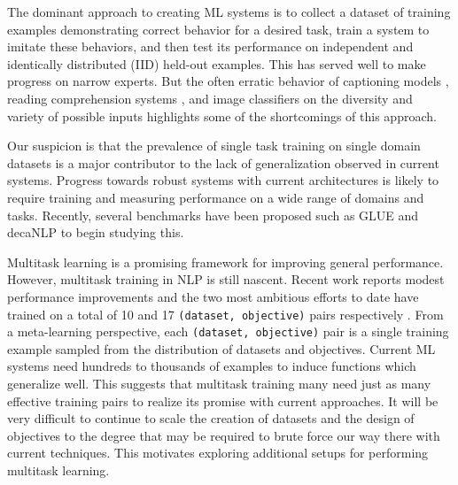 \documentclass{article}
\begin{document}
The dominant approach to creating ML systems is to collect a dataset of training examples demonstrating correct behavior for a desired task, train a system to imitate these behaviors, and then test its performance on independent and identically distributed (IID) held-out examples. This has served well to make progress on narrow experts. But the often erratic behavior of captioning models \cite{lake2017building}, reading comprehension systems \cite{jia2017adversarial}, and image classifiers \cite{alcorn2018strike} on the diversity and variety of possible inputs highlights some of the shortcomings of this approach.


Our suspicion is that the prevalence of single task training on single domain datasets is a major contributor to the lack of generalization observed in current systems. Progress towards robust systems with current architectures is likely to require training and measuring performance on a wide range of domains and tasks. Recently, several benchmarks have been proposed such as GLUE \cite{wang2018glue} and decaNLP \cite{mccann2018natural} to begin studying this.

Multitask learning \cite{caruana1997multitask} is a promising framework for improving general performance. However, multitask training in NLP is still nascent. Recent work reports modest performance improvements \cite{yogatama2019learning} and the two most ambitious efforts to date have trained on a total of 10 and 17 \texttt{(dataset, objective)} pairs respectively \cite{mccann2018natural} \cite{bowman2018looking}. From a meta-learning perspective, each \texttt{(dataset, objective)} pair is a single training example sampled from the distribution of datasets and objectives. Current ML systems need hundreds to thousands of examples to induce functions which generalize well. This suggests that multitask training many need just as many effective training pairs to realize its promise with current approaches. It will be very difficult to continue to scale the creation of datasets and the design of objectives to the degree that may be required to brute force our way there with current techniques. This motivates exploring additional setups for performing multitask learning.
\end{document}
